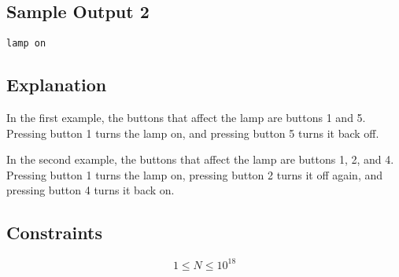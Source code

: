 \documentclass[a4paper,12pt]{article}
\begin{document}
\subsection*{Sample Output 2}
\begin{verbatim}
lamp on
\end{verbatim}

\subsection*{Explanation}
In the first example, the buttons that affect the lamp are buttons 1 and 5.  
Pressing button 1 turns the lamp on, and pressing button 5 turns it back off.

In the second example, the buttons that affect the lamp are buttons 1, 2, and 4.  
Pressing button 1 turns the lamp on,  
pressing button 2 turns it off again,  
and pressing button 4 turns it back on.

\subsection*{Constraints}
\[
1 \leq N \leq 10^{18}
\]
\end{document}
